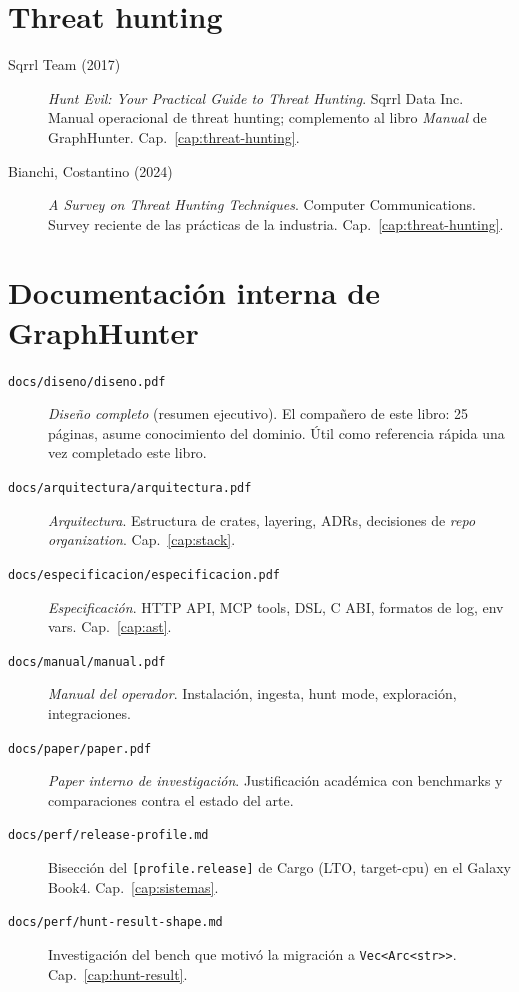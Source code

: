 \section*{Threat hunting}

\begin{description}
    \item[Sqrrl Team (2017)] \emph{Hunt Evil: Your Practical Guide
    to Threat Hunting}. Sqrrl Data Inc. Manual operacional de
    threat hunting; complemento al libro \emph{Manual} de
    GraphHunter. Cap.~\ref{cap:threat-hunting}.

    \item[Bianchi, Costantino (2024)] \emph{A Survey on Threat
    Hunting Techniques}. Computer Communications. Survey reciente
    de las prácticas de la industria. Cap.~\ref{cap:threat-hunting}.
\end{description}

\section*{Documentación interna de GraphHunter}

\begin{description}
    \item[\texttt{docs/diseno/diseno.pdf}] \emph{Diseño completo}
    (resumen ejecutivo). El compañero de este libro: 25 páginas,
    asume conocimiento del dominio. Útil como referencia rápida
    una vez completado este libro.

    \item[\texttt{docs/arquitectura/arquitectura.pdf}] \emph{Arquitectura}.
    Estructura de crates, layering, ADRs, decisiones de
    \emph{repo organization}. Cap.~\ref{cap:stack}.

    \item[\texttt{docs/especificacion/especificacion.pdf}] \emph{Especificación}.
    HTTP API, MCP tools, DSL, C ABI, formatos de log, env vars.
    Cap.~\ref{cap:ast}.

    \item[\texttt{docs/manual/manual.pdf}] \emph{Manual del operador}.
    Instalación, ingesta, hunt mode, exploración, integraciones.

    \item[\texttt{docs/paper/paper.pdf}] \emph{Paper interno de
    investigación}. Justificación académica con benchmarks y
    comparaciones contra el estado del arte.

    \item[\texttt{docs/perf/release-profile.md}] Bisección del
    \texttt{[profile.release]} de Cargo (LTO, target-cpu) en el
    Galaxy Book4. Cap.~\ref{cap:sistemas}.

    \item[\texttt{docs/perf/hunt-result-shape.md}] Investigación
    del bench que motivó la migración a \texttt{Vec<Arc<str>>}.
    Cap.~\ref{cap:hunt-result}.
\end{description}

